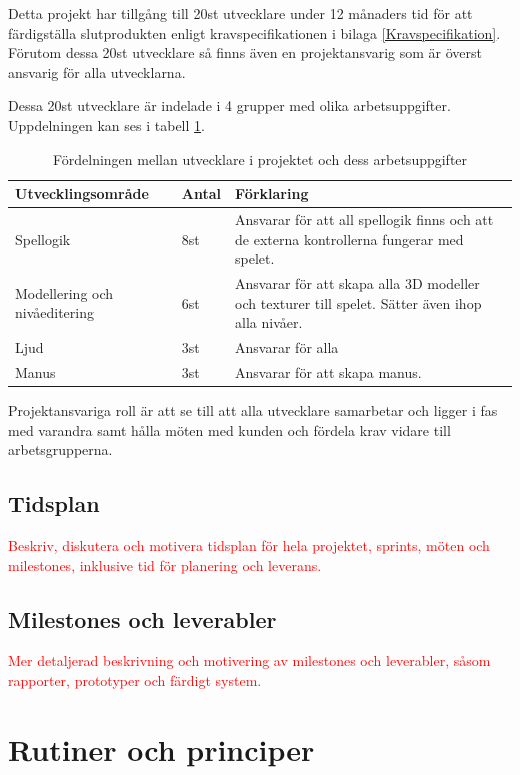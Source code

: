 \documentclass[a4paper,12pt,oneside,final]{extbook}
\begin{document}
Detta projekt har tillgång till 20st utvecklare under 12 månaders tid för att färdigställa slutprodukten enligt kravspecifikationen i bilaga \ref{Kravspecifikation}. Förutom dessa 20st utvecklare så finns även en projektansvarig som är överst ansvarig för alla utvecklarna. 

Dessa 20st utvecklare är indelade i 4 grupper med olika arbetsuppgifter. Uppdelningen kan ses i tabell \ref{Utvecklare}.
\begin{table}[h]
	\centering
	\caption{Fördelningen mellan utvecklare i projektet och dess arbetsuppgifter}
	\label{Utvecklare}
	\begin{tabular}{ | p{10em} | m{3em} |p{23em}| } 
		\hline
		\textbf{Utvecklingsområde}&\textbf{Antal}  &\textbf{ Förklaring} \\ 
		\hline
		Spellogik &8st & Ansvarar för att all spellogik finns och att de externa kontrollerna fungerar med spelet. \\ 
		\hline
		Modellering och nivåeditering &6st & Ansvarar för att skapa alla 3D modeller och texturer till spelet. Sätter även ihop alla nivåer.  \\ 
		\hline
		Ljud &3st & Ansvarar för alla   \\ 
		\hline
		Manus &3st &Ansvarar för att skapa manus.   \\ 
		\hline	
	\end{tabular}
\end{table}


Projektansvariga roll är att se till att alla utvecklare samarbetar och ligger i fas med varandra samt hålla möten med kunden och fördela krav vidare till arbetsgrupperna.

\section{Tidsplan}

\textcolor{red}{Beskriv, diskutera och motivera tidsplan för hela projektet, sprints, möten och milestones, inklusive
tid för planering och leverans.}

\section{Milestones och leverabler}

\textcolor{red}{Mer detaljerad beskrivning och motivering av milestones och leverabler, såsom rapporter, prototyper
och färdigt system.
}


\chapter{Rutiner och principer}
\end{document}
